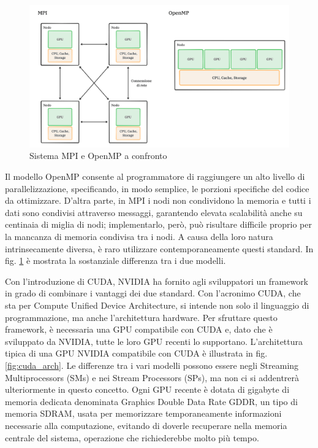 \begin{figure}[ht]
    \centering
    \includegraphics[width=.9\linewidth]{images/chapter2/mpi_openmp.png}
    \caption{Sistema MPI e OpenMP a confronto}
    \label{fig:mpi_openmp}
\end{figure}

Il modello OpenMP consente al programmatore di raggiungere un alto livello di parallelizzazione, specificando, in modo semplice, le porzioni specifiche del codice da ottimizzare. D'altra parte, in MPI i nodi non condividono la memoria e tutti i dati sono condivisi attraverso messaggi, garantendo elevata scalabilità anche su centinaia di miglia di nodi; implementarlo, però,  può risultare difficile proprio per la mancanza di memoria condivisa tra i nodi. A causa della loro natura intrinsecamente diversa, è raro utilizzare contemporaneamente questi standard. In fig. \ref{fig:mpi_openmp} è mostrata la sostanziale differenza tra i due modelli.

Con l'introduzione di CUDA, NVIDIA ha fornito agli sviluppatori un framework in grado di combinare i vantaggi dei due standard. Con l'acronimo CUDA, che sta per Compute Unified Device Architecture, si intende non solo il linguaggio di programmazione, ma anche l'architettura hardware. Per sfruttare questo framework, è necessaria una GPU compatibile con CUDA e, dato che è sviluppato da NVIDIA, tutte le loro GPU recenti lo supportano. L'architettura tipica di una GPU NVIDIA compatibile con CUDA è illustrata in fig. \ref{fig:cuda_arch}. Le differenze tra i vari modelli possono essere negli Streaming Multiprocessors (SMs) e nei Stream Processors (SPs), ma non ci si addentrerà ulteriormente in questo concetto. Ogni GPU recente è dotata di gigabyte di memoria dedicata denominata Graphics Double Data Rate \gls{GDDR}, un tipo di memoria SDRAM, usata per memorizzare temporaneamente informazioni necessarie alla computazione, evitando di doverle recuperare nella memoria centrale del sistema, operazione che richiederebbe molto più tempo.


